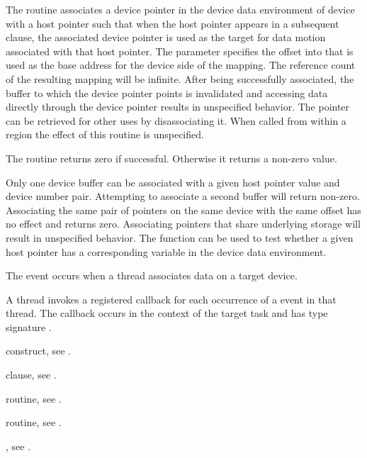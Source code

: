 \effect
The  routine associates a device pointer
in the device data environment of device 
with a host pointer such that when the host pointer appears in a subsequent
 clause, the associated device pointer is used as the target for
data motion associated with that host pointer.  The 
parameter specifies the offset into  that is used as the
base address for the device side of the mapping. The reference count of the
resulting mapping will be infinite.  After being successfully associated, the
buffer to which the device pointer points is invalidated and accessing data
directly through the device pointer results in unspecified behavior.  The
pointer can be retrieved for other uses by disassociating it.
When called from within a  region
the effect of this routine is unspecified.

The routine returns zero if successful. Otherwise it returns a non-zero value.

Only one device buffer can be associated with a given host pointer value and
device number pair. Attempting to associate a second buffer will return
non-zero. Associating the same pair of pointers on the same device with the
same offset has no effect and returns zero.  Associating pointers that share
underlying storage will result in unspecified behavior. The
 function can be used to test whether a given
host pointer has a corresponding variable in the device data environment.

\events
The  event occurs when a thread associates 
data on a target device.

\tools
A thread invokes a registered 
callback for each occurrence of a  event in 
that thread. The callback occurs in the context of the target task and
has type signature .

\begin{crossrefs}
\item {} construct, see .

\item {} clause, see .

\item {} routine, see .

\item {} routine, see
.

\item {}, see
.
\end{crossrefs}



